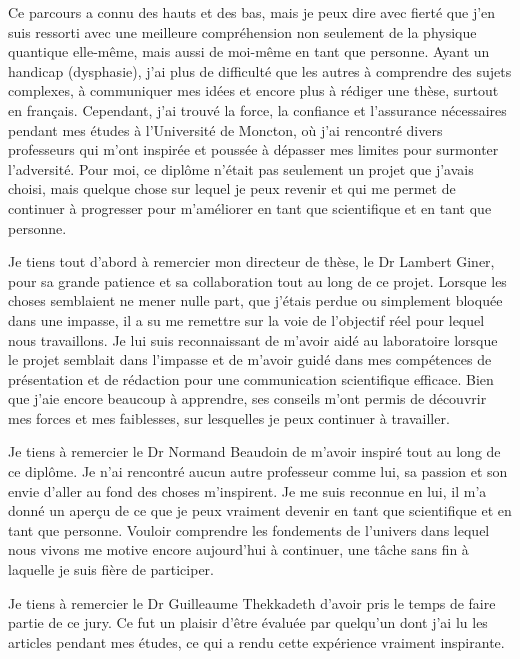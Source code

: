 \begin{onehalfspace}
    Ce parcours a connu des hauts et des bas, mais je peux dire avec fierté que j'en suis ressorti avec une meilleure compréhension non seulement de la physique quantique elle-même, mais aussi de moi-même en tant que personne. Ayant un handicap (dysphasie), j'ai plus de difficulté que les autres à comprendre des sujets complexes, à communiquer mes idées et encore plus à rédiger une thèse, surtout en français. Cependant, j'ai trouvé la force, la confiance et l'assurance nécessaires pendant mes études à l'Université de Moncton, où j'ai rencontré divers professeurs qui m'ont inspirée et poussée à dépasser mes limites pour surmonter l'adversité. Pour moi, ce diplôme n'était pas seulement un projet que j'avais choisi, mais quelque chose sur lequel je peux revenir et qui me permet de continuer à progresser pour m'améliorer en tant que scientifique et en tant que personne. 

    \noindent Je tiens tout d'abord à remercier mon directeur de thèse, le Dr Lambert Giner, pour sa grande patience et sa collaboration tout au long de ce projet. Lorsque les choses semblaient ne mener nulle part, que j'étais perdue ou simplement bloquée dans une impasse, il a su me remettre sur la voie de l'objectif réel pour lequel nous travaillons. Je lui suis reconnaissant de m'avoir aidé au laboratoire lorsque le projet semblait dans l'impasse et de m'avoir guidé dans mes compétences de présentation et de rédaction pour une communication scientifique efficace. Bien que j'aie encore beaucoup à apprendre, ses conseils m'ont permis de découvrir mes forces et mes faiblesses, sur lesquelles je peux continuer à travailler. 

    \noindent Je tiens à remercier le Dr Normand Beaudoin de m'avoir inspiré tout au long de ce diplôme. Je n'ai rencontré aucun autre professeur comme lui, sa passion et son envie d'aller au fond des choses m'inspirent. Je me suis reconnue en lui, il m'a donné un aperçu de ce que je peux vraiment devenir en tant que scientifique et en tant que personne. Vouloir comprendre les fondements de l'univers dans lequel nous vivons me motive encore aujourd'hui à continuer, une tâche sans fin à laquelle je suis fière de participer. 

    \noindent Je tiens à remercier le Dr Guilleaume Thekkadeth d'avoir pris le temps de faire partie de ce jury. Ce fut un plaisir d'être évaluée par quelqu'un dont j'ai lu les articles pendant mes études, ce qui a rendu cette expérience vraiment inspirante. 


\end{onehalfspace}

